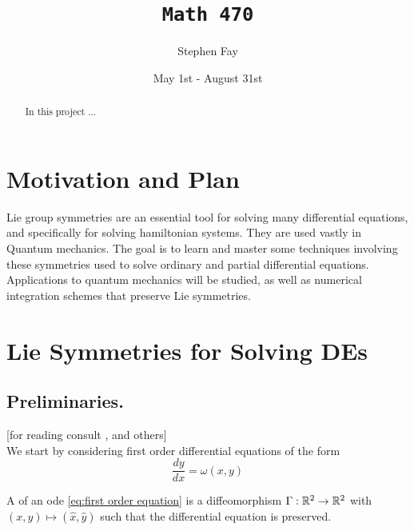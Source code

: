 \documentclass[12pt]{article}
\begin{document}
 
 
\title{\texttt{Math 470}}
\author{Stephen Fay}
\date{May 1st - August 31st}
\maketitle


\begin{abstract}
    In this project ...
\end{abstract}

\tableofcontents

\section{Motivation and Plan}

Lie group symmetries are an essential tool for solving many differential equations, and specifically for solving hamiltonian systems. They are used vastly in Quantum mechanics. The goal is to learn and master some techniques involving these symmetries used to solve ordinary and partial differential equations. Applications to quantum mechanics will be studied, as well as numerical integration schemes that preserve Lie symmetries. 

\section{Lie Symmetries for Solving DEs}

\subsection{Preliminaries.}

[for reading consult \cite{R-Steinhour},\cite{Symmetry-methods} and others]\\

We start by considering first order differential equations of the form
\begin{equation}\label{eq:first order equation}
    \frac{dy}{dx} = \omega(x,y)
\end{equation}

A  of an ode \eqref{eq:first order equation} is a diffeomorphism $\Gamma : \mathbb{R}^2\to\mathbb{R}^2$ with $(x,y)\mapsto (\hat x,\hat y)$ such that the differential equation is preserved.
\end{document}

